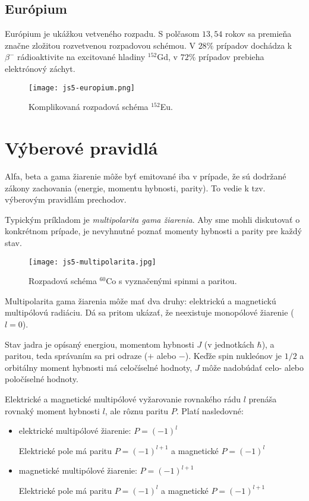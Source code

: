 \documentclass[../../main.tex]{subfiles}
\begin{document}
\subsection{Európium}

Európium je ukážkou vetveného rozpadu. S polčasom $13,54$ rokov sa premieňa značne zložitou rozvetvenou rozpadovou schémou. V $28\%$ prípadov dochádza k $\beta^-$ rádioaktivite na excitované hladiny $^{152}$Gd, v $72\%$ prípadov prebieha elektrónový záchyt. 

\begin{figure}[h]
\centering
\texttt{[image: js5-europium.png]}
\caption{Komplikovaná rozpadová schéma $^{152}$Eu.}
\label{js5:img:europium}
\end{figure}

\section{Výberové pravidlá}

Alfa, beta a gama žiarenie môže byť emitované iba v prípade, že sú dodržané zákony zachovania (energie, momentu hybnosti, parity). To vedie k tzv. výberovým pravidlám prechodov. 

Typickým príkladom je \textit{multipolarita gama žiarenia}. Aby sme mohli diskutovať o konkrétnom prípade, je nevyhnutné poznať momenty hybnosti a parity pre každý stav.

\begin{figure}[h]
\centering
\texttt{[image: js5-multipolarita.jpg]}
\caption{Rozpadová schéma $^{60}$Co s vyznačenými spinmi a paritou.}
\label{js5:img:multipolarita}
\end{figure}

Multipolarita gama žiarenia môže mať dva druhy: elektrickú a magnetickú multipólovú radiáciu. Dá sa pritom ukázať, že neexistuje monopólové žiarenie ($l=0$). 

Stav jadra je opísaný energiou, momentom hybnosti $J$ (v jednotkách $\hbar$), a paritou, teda správaním sa pri odraze ($+$ alebo $-$). Keďže spin nukleónov je $1/2$ a orbitálny moment hybnosti má celočíselné hodnoty, $J$ môže nadobúdať celo- alebo poločíselné hodnoty.

Elektrické a magnetické multipólové vyžarovanie rovnakého rádu $l$ prenáša rovnaký moment hybnosti $l$, ale rôznu paritu $P$. Platí nasledovné:
\begin{itemize}
\item elektrické multipólové žiarenie: $P=(-1)^l$

Elektrické pole má paritu $P=(-1)^{l+1}$ a magnetické $P=(-1)^{l}$
\item magnetické multipólové žiarenie: $P=(-1)^{l+1}$

Elektrické pole má paritu $P=(-1)^{l}$ a magnetické $P=(-1)^{l+1}$
\end{itemize}
\end{document}
